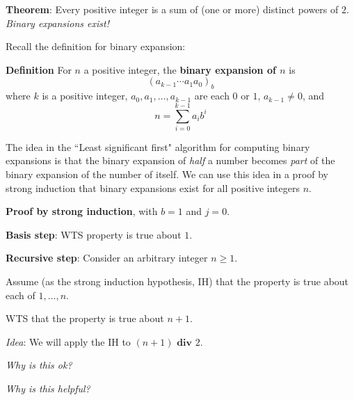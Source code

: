 \documentclass[12pt, oneside]{article}
\begin{document}
{\bf Theorem}: Every positive integer is a sum of (one or more) distinct powers of $2$.
{\it Binary expansions exist!}

Recall the definition for binary expansion:



{\bf Definition} For $n$ a positive integer, 
the {\bf binary expansion of $n$}  is
\[
(a_{k-1} \cdots a_1 a_0)_b
\]
where $k$ is a positive integer, $a_0, a_1, \ldots, a_{k-1}$ 
are each $0$ or $1$, $a_{k-1} \neq  0$, and
\[
n =  \sum_{i=0}^{k-1} a_{i} b^{i}
\]
 

The idea in the ``Least significant first" algorithm 
for computing binary expansions is that the binary
expansion of {\it half} a number becomes {\it part} of the binary expansion of 
the number of itself. We can use this 
idea in a proof by strong induction that binary expansions exist for all 
positive integers $n$.


{\bf Proof by strong induction}, with $b=1$ and $j=0$.


{\bf Basis step}:  WTS property is true about  $1$.

\phantom{Choose $a_0 = 1$, then $(a_0)_2 = 1 \cdot 2^0 = 1$.}
\vspace{80pt}


{\bf Recursive step}: Consider an arbitrary integer $n \geq 1$.

Assume (as the strong induction hypothesis, IH) that the property is true about  each of $1, \ldots, n$.  

WTS that the property is true about $n+1$.

{\it Idea}: We will apply the IH to $(n+1) \textbf{ div } 2$.

{\it Why is this ok?}

\vspace{100pt}

{\it Why is this helpful?}
\end{document}
